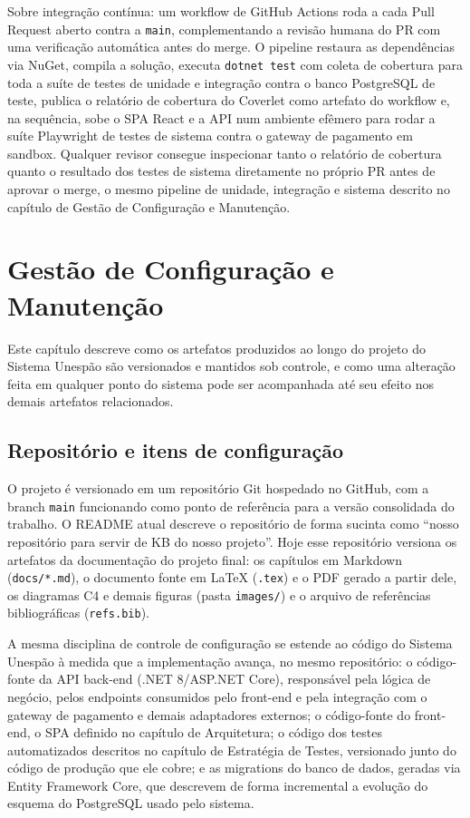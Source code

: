 \documentclass[a4paper,12pt,oneside,openany]{book}
\begin{document}
Sobre integração contínua: um workflow de GitHub Actions roda a cada Pull Request aberto contra a \texttt{main}, complementando a revisão humana do PR com uma verificação automática antes do merge. O pipeline restaura as dependências via NuGet, compila a solução, executa \texttt{dotnet test} com coleta de cobertura para toda a suíte de testes de unidade e integração contra o banco PostgreSQL de teste, publica o relatório de cobertura do Coverlet como artefato do workflow e, na sequência, sobe o SPA React e a API num ambiente efêmero para rodar a suíte Playwright de testes de sistema contra o gateway de pagamento em sandbox. Qualquer revisor consegue inspecionar tanto o relatório de cobertura quanto o resultado dos testes de sistema diretamente no próprio PR antes de aprovar o merge, o mesmo pipeline de unidade, integração e sistema descrito no capítulo de Gestão de Configuração e Manutenção.

\chapter{Gestão de Configuração e Manutenção}

Este capítulo descreve como os artefatos produzidos ao longo do projeto do Sistema Unespão são versionados e mantidos sob controle, e como uma alteração feita em qualquer ponto do sistema pode ser acompanhada até seu efeito nos demais artefatos relacionados.

\section{Repositório e itens de configuração}

O projeto é versionado em um repositório Git hospedado no GitHub, com a branch \texttt{main} funcionando como ponto de referência para a versão consolidada do trabalho. O README atual descreve o repositório de forma sucinta como ``nosso repositório para servir de KB do nosso projeto''. Hoje esse repositório versiona os artefatos da documentação do projeto final: os capítulos em Markdown (\texttt{docs/*.md}), o documento fonte em LaTeX (\texttt{.tex}) e o PDF gerado a partir dele, os diagramas C4 e demais figuras (pasta \texttt{images/}) e o arquivo de referências bibliográficas (\texttt{refs.bib}).

A mesma disciplina de controle de configuração se estende ao código do Sistema Unespão à medida que a implementação avança, no mesmo repositório: o código-fonte da API back-end (.NET 8/ASP.NET Core), responsável pela lógica de negócio, pelos endpoints consumidos pelo front-end e pela integração com o gateway de pagamento e demais adaptadores externos; o código-fonte do front-end, o SPA definido no capítulo de Arquitetura; o código dos testes automatizados descritos no capítulo de Estratégia de Testes, versionado junto do código de produção que ele cobre; e as migrations do banco de dados, geradas via Entity Framework Core, que descrevem de forma incremental a evolução do esquema do PostgreSQL usado pelo sistema.
\end{document}
